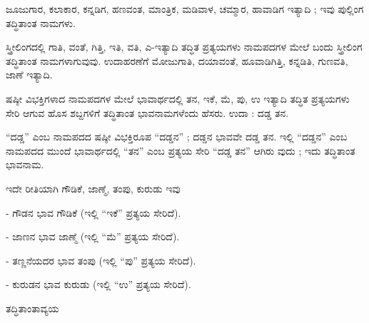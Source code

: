 \noindent\hspace*{1.2em}\hspace{0.6em}ಜೂಜುಗಾರ, ಕಲಾಕಾರ, ಕನ್ನಡಿಗ, ಹಣವಂತ, ಮಾಂತ್ರಿಕ, ಮಡಿವಾಳ, ಚಮ್ಮಾರ, ಹಾವಾಡಿಗ ಇತ್ಯಾದಿ ; ಇವು ಪುಲ್ಲಿಂಗ ತದ್ಧಿತಾಂತ ನಾಮಗಳು.\par

\vspace{2.5pt plus 3pt minus 0.5pt}\noindent\hspace*{1.2em}\hspace{0.55em}ಸ್ತ್ರೀಲಿಂಗದಲ್ಲಿ ಗಾತಿ, ವಂತೆ, ಗಿತ್ತಿ, ಇತಿ, ವತಿ, ಎ-ಇತ್ಯಾದಿ ತದ್ಧಿತ ಪ್ರತ್ಯಯಗಳು ನಾಮಪದಗಳ ಮೇಲೆ ಬಂದು ಸ್ತ್ರೀಲಿಂಗ ತದ್ಧಿತಾಂತ ನಾಮಗಳಾಗುವುವು. ಉದಾಹರಣೆಗೆ ಮೋಜುಗಾತಿ, ದಯಾವಂತೆ, ಹೂವಾಡಿಗಿತ್ತಿ, ಕನ್ನಡಿತಿ, ಗುಣವತಿ, ಜಾಣೆ ಇತ್ಯಾದಿ.\par


\indent ಷಷ್ಠೀ ವಿಭಕ್ತಿಗಳಾದ ನಾಮಪದಗಳ ಮೇಲೆ ಭಾವಾರ್ಥದಲ್ಲಿ ತನ, ಇಕೆ, ಮೆ, ಪು, ಉ ಇತ್ಯಾದಿ ತದ್ಧಿತ ಪ್ರತ್ಯಯಗಳು ಸೇರಿ ಆಗುವ ಹೊಸ ಶಬ್ದಗಳಿಗೆ ತದ್ಧಿತಾಂತ ಭಾವನಾಮಗಳೆಂದು ಹೆಸರು. ಉದಾ : ದಡ್ಡ ತನ.\par

\begin{kbvnote}
\hspace{0.5em}“ದಡ್ಡ” ಎಂಬ ನಾಮಪದದ ಷಷ್ಠೀ ವಿಭಕ್ತಿರೂಪ “ದಡ್ಡನ” ; ದಡ್ಡನ ಭಾವವೇ ದಡ್ಡ ತನ. ಇಲ್ಲಿ “ದಡ್ಡನ” ಎಂಬ ನಾಮಪದದ ಮುಂದೆ ಭಾವಾರ್ಥದಲ್ಲಿ “ತನ” ಎಂಬ ಪ್ರತ್ಯಯ ಸೇರಿ “ದಡ್ಡ ತನ” ಆಗಿರು ವುದು ; ಇದು ತದ್ಧಿತಾಂತ ಭಾವನಾಮ.
\end{kbvnote}

\indent ಇದೇ ರೀತಿಯಾಗಿ ಗೌಡಿಕೆ, ಜಾಣ್ಮೆ, ತಂಪು, ಕುರುಡು ಇವು\par



\indent - ಗೌಡನ ಭಾವ ಗೌಡಿಕೆ (ಇಲ್ಲಿ “ಇಕೆ” ಪ್ರತ್ಯಯ ಸೇರಿದೆ).\par

\indent - ಜಾಣನ ಭಾವ ಜಾಣ್ಮೆ (ಇಲ್ಲಿ “ಮೆ” ಪ್ರತ್ಯಯ ಸೇರಿದೆ).\par

\indent - ತಣ್ಣನೆಯದರ ಭಾವ ತಂಪು (ಇಲ್ಲಿ “ಪು” ಪ್ರತ್ಯಯ ಸೇರಿದೆ).\par

\indent - ಕುರುಡನ ಭಾವ ಕುರುಡು (ಇಲ್ಲಿ “ಉ” ಪ್ರತ್ಯಯ ಸೇರಿದೆ).\par

\vspace{2.5pt plus 3pt minus 0.5pt}\noindent\hspace*{1.2em}\hspace{0.55em}ತದ್ಧಿತಾಂತಾವ್ಯಯ\par

